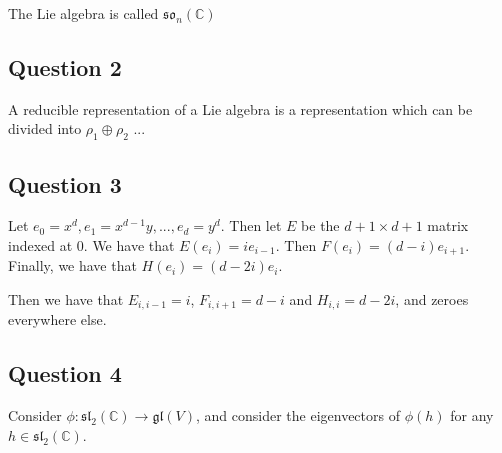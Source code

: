 \documentclass[]{article}
\begin{document}
The Lie algebra is called $\mathfrak{so}_n(\mathbb{C})$ 
\subsection*{Question 2}
A reducible representation of a Lie algebra is a representation which can be divided into $\rho_1 \oplus \rho_2$ ... 
\subsection*{Question 3}
Let $e_0 = x^d, e_1 = x^{d - 1} y , ... , e_d = y^d$. Then let $E$ be the $d + 1 \times d + 1$ matrix indexed at 0. We have that $E(e_i) = i e_{i - 1}$. Then $F(e_i) = (d - i) e_{i + 1}$. Finally, we have that $H(e_i) = (d - 2i) e_i$. 

Then we have that $E_{i, i - 1} = i$, $F_{i, i + 1} = d - i$ and $H_{i, i} = d - 2i$, and zeroes everywhere else. 

\subsection*{Question 4}
Consider $\phi: \mathfrak{sl}_2(\mathbb{C}) \rightarrow \mathfrak{gl}(V)$, and consider the eigenvectors of $\phi(h)$ for any $h \in \mathfrak{sl}_2(\mathbb{C})$. 
\end{document}

